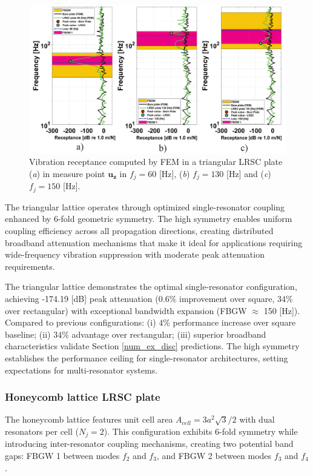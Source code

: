 \documentclass[review,numbers,sort&compress]{elsarticle}
\begin{document}
\begin{figure}[htb]
	\centering
	\includegraphics[width=1.0\textwidth]{2_3_disp_frf_trian_3_receps.pdf}
	\caption{Vibration receptance computed by FEM in a triangular LRSC plate (\textit{a}) in measure point $\mathbf{u_z}$ in $f_j = 60$ [Hz], (\textit{b}) $f_j = 130$ [Hz] and (\textit{c}) $f_j = 150$ [Hz].}
	\label{lat_t_tr_frf_f1_f2_f3}
\end{figure}

The triangular lattice operates through optimized single-resonator coupling enhanced by 6-fold geometric symmetry. The high symmetry enables uniform coupling efficiency across all propagation directions, creating distributed broadband attenuation mechanisms that make it ideal for applications requiring wide-frequency vibration suppression with moderate peak attenuation requirements.

The triangular lattice demonstrates the optimal single-resonator configuration, achieving -174.19 [dB] peak attenuation ($0.6\%$ improvement over square, $34\%$ over rectangular) with exceptional bandwidth expansion (FBGW $\approx$ 150 [Hz]). Compared to previous configurations: (i) $4\%$ performance increase over square baseline; (ii) $34\%$ advantage over rectangular; (iii) superior broadband characteristics validate Section \ref{num_ex_disc} predictions. The high symmetry establishes the performance ceiling for single-resonator architectures, setting expectations for multi-resonator systems.

\subsubsection{Honeycomb lattice LRSC plate}\label{panel_lat_h}

The honeycomb lattice features unit cell area $A_{cell} = 3a^2\sqrt{3}/2$ with dual resonators per cell ($N_j = 2$). This configuration exhibits 6-fold symmetry while introducing inter-resonator coupling mechanisms, creating two potential band gaps: FBGW 1 between modes $f_2$ and $f_3$, and FBGW 2 between modes $f_3$ and $f_4$.
\end{document}

